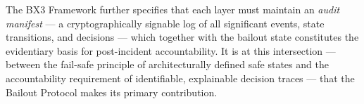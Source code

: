 The BX3 Framework further specifies that each layer must maintain an \emph{audit manifest} — a cryptographically signable log of all significant events, state transitions, and decisions — which together with the bailout state constitutes the evidentiary basis for post-incident accountability. It is at this intersection — between the fail-safe principle of architecturally defined safe states and the accountability requirement of identifiable, explainable decision traces — that the Bailout Protocol makes its primary contribution.
